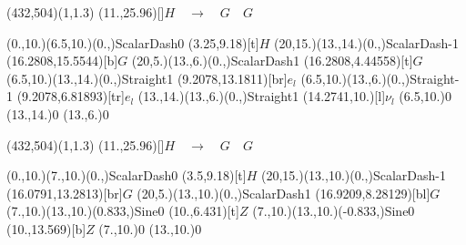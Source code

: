 \unitlength=1bp%

\begin{feynartspicture}(432,504)(1,1.3)
\FALabel(11.,25.96)[]{\large $H\quad \to\quad G\quad G$}

\FAProp(0.,10.)(6.5,10.)(0.,){ScalarDash}{0}
\FALabel(3.25,9.18)[t]{$H$}
\FAProp(20,15.)(13.,14.)(0.,){ScalarDash}{-1}
\FALabel(16.2808,15.5544)[b]{$G$}
\FAProp(20,5.)(13.,6.)(0.,){ScalarDash}{1}
\FALabel(16.2808,4.44558)[t]{$G$}
\FAProp(6.5,10.)(13.,14.)(0.,){Straight}{1}
\FALabel(9.2078,13.1811)[br]{$e_l$}
\FAProp(6.5,10.)(13.,6.)(0.,){Straight}{-1}
\FALabel(9.2078,6.81893)[tr]{$e_l$}
\FAProp(13.,14.)(13.,6.)(0.,){Straight}{1}
\FALabel(14.2741,10.)[l]{$\nu_l$}
\FAVert(6.5,10.){0}
\FAVert(13.,14.){0}
\FAVert(13.,6.){0}
\end{feynartspicture}

\begin{feynartspicture}(432,504)(1,1.3)
\FALabel(11.,25.96)[]{\large $H\quad \to\quad G\quad G$}

\FAProp(0.,10.)(7.,10.)(0.,){ScalarDash}{0}
\FALabel(3.5,9.18)[t]{$H$}
\FAProp(20,15.)(13.,10.)(0.,){ScalarDash}{-1}
\FALabel(16.0791,13.2813)[br]{$G$}
\FAProp(20,5.)(13.,10.)(0.,){ScalarDash}{1}
\FALabel(16.9209,8.28129)[bl]{$G$}
\FAProp(7.,10.)(13.,10.)(0.833,){Sine}{0}
\FALabel(10.,6.431)[t]{$Z$}
\FAProp(7.,10.)(13.,10.)(-0.833,){Sine}{0}
\FALabel(10.,13.569)[b]{$Z$}
\FAVert(7.,10.){0}
\FAVert(13.,10.){0}
\end{feynartspicture}

